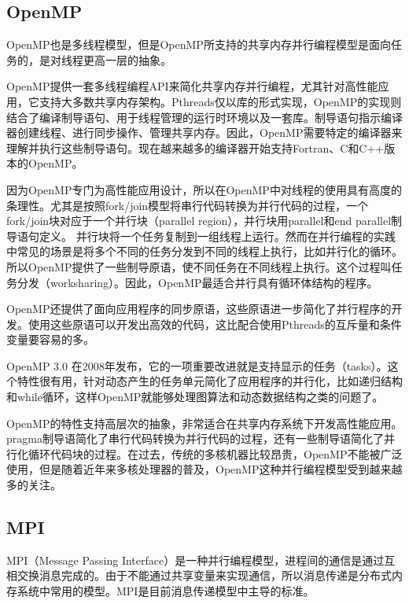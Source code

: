 \subsection{OpenMP}

OpenMP\citep{OpenMP}也是多线程模型，但是OpenMP所支持的共享内存并行编程模型是面向任务的，是对线程更高一层的抽象。

OpenMP提供一套多线程编程API来简化共享内存并行编程，尤其针对高性能应用，它支持大多数共享内存架构。Pthreads仅以库的形式实现，OpenMP的实现则结合了编译制导语句、用于线程管理的运行时环境以及一套库。制导语句指示编译器创建线程、进行同步操作、管理共享内存。因此，OpenMP需要特定的编译器来理解并执行这些制导语句。现在越来越多的编译器开始支持Fortran、C和C++版本的OpenMP。

因为OpenMP专门为高性能应用设计，所以在OpenMP中对线程的使用具有高度的条理性。尤其是按照fork/join模型将串行代码转换为并行代码的过程，一个fork/join块对应于一个并行块（parallel region），并行块用parallel和end parallel制导语句定义。 并行块将一个任务复制到一组线程上运行。然而在并行编程的实践中常见的场景是将多个不同的任务分发到不同的线程上执行，比如并行化的循环。所以OpenMP提供了一些制导原语，使不同任务在不同线程上执行。这个过程叫任务分发（worksharing）。因此，OpenMP最适合并行具有循环体结构的程序\citep{mattson2004patterns}。

OpenMP还提供了面向应用程序的同步原语，这些原语进一步简化了并行程序的开发。使用这些原语可以开发出高效的代码，这比配合使用Pthreads的互斥量和条件变量要容易的多。

OpenMP 3.0 在2008年发布\citep{openmp2008spec3}，它的一项重要改进就是支持显示的任务（tasks）。这个特性很有用，针对动态产生的任务单元简化了应用程序的并行化，比如递归结构和while循环，这样OpenMP就能够处理图算法和动态数据结构之类的问题了。

OpenMP的特性支持高层次的抽象，非常适合在共享内存系统下开发高性能应用。pragma制导语简化了串行代码转换为并行代码的过程，还有一些制导语简化了并行化循环代码块的过程。在过去，传统的多核机器比较昂贵，OpenMP不能被广泛使用，但是随着近年来多核处理器的普及，OpenMP这种并行编程模型受到越来越多的关注。

\subsection{MPI}

MPI（Message Passing Interface）是一种并行编程模型，进程间的通信是通过互相交换消息完成的。由于不能通过共享变量来实现通信，所以消息传递是分布式内存系统中常用的模型。MPI是目前消息传递模型中主导的标准。
  
